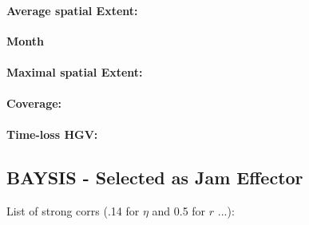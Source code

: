 \begin{table}[ht]
\paragraph{Average spatial Extent:}

\large
\centerline{\textbf{Month}}
\normalsize

\paragraph{Maximal spatial Extent:}
\paragraph{Coverage:}
\paragraph{Time-loss HGV:}

\subsection{BAYSIS - Selected as Jam Effector}

List of strong corrs (.14 for $\eta$ and 0.5 for $r$ ...):


\end{table}

